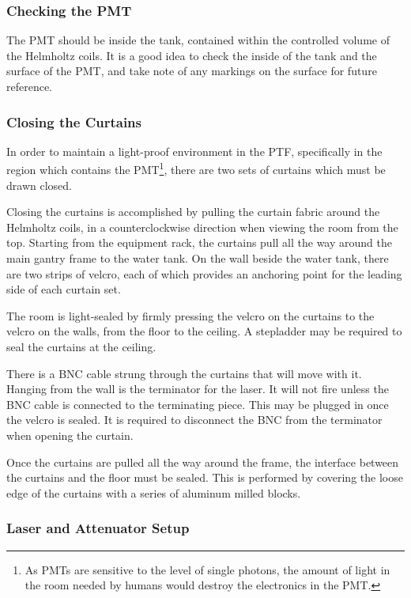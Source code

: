 \documentclass[twoside,letterpaper]{refart}
\begin{document}
\subsubsection{Checking the PMT}

The PMT should be inside the tank, contained within the controlled volume of the Helmholtz coils. It is a good idea to check the inside of the tank and the surface of the PMT, and take note of any markings on the surface for future reference.

\subsubsection{Closing the Curtains}

In order to maintain a light-proof environment in the PTF, specifically in the region which contains the PMT\footnote{As PMTs are sensitive to the level of single photons, the amount of light in the room needed by humans would destroy the electronics in the PMT.}, there are two sets of curtains which must be drawn closed.

Closing the curtains is accomplished by pulling the curtain fabric around the Helmholtz coils, in a counterclockwise direction when viewing the room from the top. Starting from the equipment rack, the curtains pull all the way around the main gantry frame to the water tank. On the wall beside the water tank, there are two strips of velcro, each of which provides an anchoring point for the leading side of each curtain set.

The room is light-sealed by firmly pressing the velcro on the curtains to the velcro on the walls, from the floor to the ceiling. A stepladder may be required to seal the curtains at the ceiling.

There is a BNC cable strung through the curtains that will move with it. Hanging from the wall is the terminator for the laser. It will not fire unless the BNC cable is connected to the terminating piece. This may be plugged in once the velcro is sealed. It is required to disconnect the BNC from the terminator when opening the curtain.

Once the curtains are pulled all the way around the frame, the interface between the curtains and the floor must be sealed. This is performed by covering the loose edge of the curtains with a series of aluminum milled blocks.


\subsubsection{Laser and Attenuator Setup}
\end{document}

